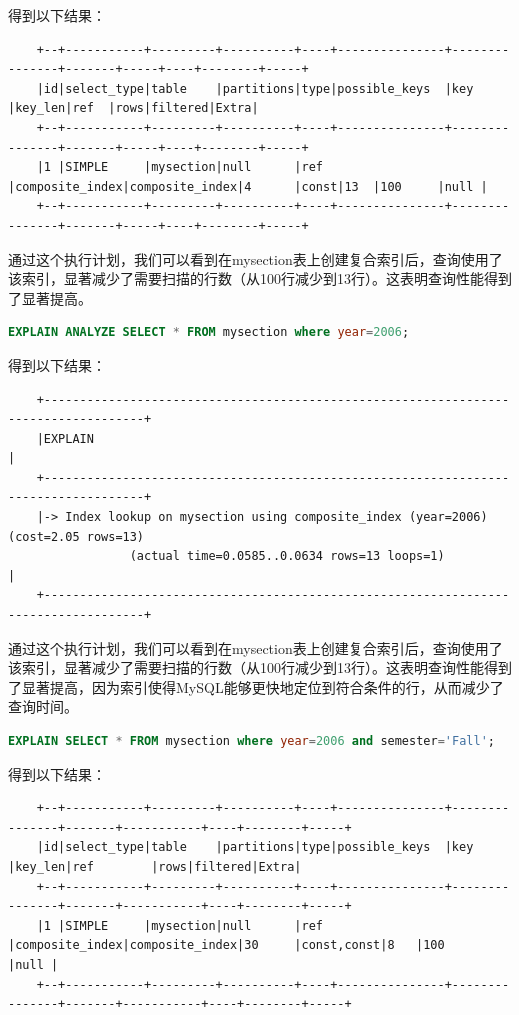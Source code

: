 \documentclass{article}
\begin{document}
	得到以下结果：
	
	\begin{verbatim}
	+--+-----------+---------+----------+----+---------------+---------------+-------+-----+----+--------+-----+
	|id|select_type|table    |partitions|type|possible_keys  |key            |key_len|ref  |rows|filtered|Extra|
	+--+-----------+---------+----------+----+---------------+---------------+-------+-----+----+--------+-----+
	|1 |SIMPLE     |mysection|null      |ref |composite_index|composite_index|4      |const|13  |100     |null |
	+--+-----------+---------+----------+----+---------------+---------------+-------+-----+----+--------+-----+
	\end{verbatim}
	
	通过这个执行计划，我们可以看到在mysection表上创建复合索引后，查询使用了该索引，显著减少了需要扫描的行数（从100行减少到13行）。这表明查询性能得到了显著提高。
	
	\begin{lstlisting}[language=sql, title=索引对查询性能的影响, tabsize=4]
	EXPLAIN ANALYZE SELECT * FROM mysection where year=2006;
	\end{lstlisting}
	
	得到以下结果：
	
	\begin{verbatim}
	+------------------------------------------------------------------------------------+
	|EXPLAIN                                                                             |
	+------------------------------------------------------------------------------------+
	|-> Index lookup on mysection using composite_index (year=2006)  (cost=2.05 rows=13) 
	             (actual time=0.0585..0.0634 rows=13 loops=1)                            |
	+------------------------------------------------------------------------------------+
	\end{verbatim}
	
	通过这个执行计划，我们可以看到在mysection表上创建复合索引后，查询使用了该索引，显著减少了需要扫描的行数（从100行减少到13行）。这表明查询性能得到了显著提高，因为索引使得MySQL能够更快地定位到符合条件的行，从而减少了查询时间。
	
	\begin{lstlisting}[language=sql, title=索引对查询性能的影响, tabsize=4]
	EXPLAIN SELECT * FROM mysection where year=2006 and semester='Fall';
	\end{lstlisting}
	
	得到以下结果：
	
	\begin{verbatim}
	+--+-----------+---------+----------+----+---------------+---------------+-------+-----------+----+--------+-----+
	|id|select_type|table    |partitions|type|possible_keys  |key            |key_len|ref        |rows|filtered|Extra|
	+--+-----------+---------+----------+----+---------------+---------------+-------+-----------+----+--------+-----+
	|1 |SIMPLE     |mysection|null      |ref |composite_index|composite_index|30     |const,const|8   |100     |null |
	+--+-----------+---------+----------+----+---------------+---------------+-------+-----------+----+--------+-----+
	\end{verbatim}
	
\end{document}
